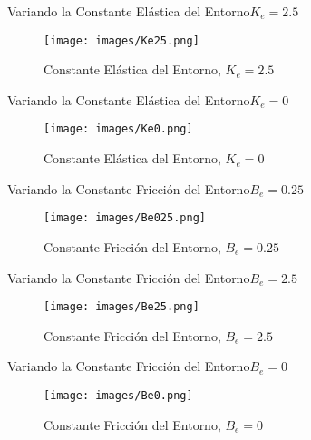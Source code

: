 \documentclass{beamer}
\begin{document}
\begin{frame}{Variando la Constante Elástica del Entorno}{$K_e=2.5$}
	
	\begin{figure}[h!]
		\centering
		\texttt{[image: images/Ke25.png]}
		\caption{Constante Elástica del Entorno, $K_e=2.5$}
		\label{KE25}
	\end{figure}
	
\end{frame}

\begin{frame}{Variando la Constante Elástica del Entorno}{$K_e=0$}
	
	\begin{figure}[h!]
		\centering
		\texttt{[image: images/Ke0.png]}
		\caption{Constante Elástica del Entorno, $K_e=0$}
		\label{KE0}
	\end{figure}
	
\end{frame}

\begin{frame}{Variando la Constante Fricción del Entorno}{$B_e=0.25$}
	
	\begin{figure}[h!]
		\centering
		\texttt{[image: images/Be025.png]}
		\caption{Constante Fricción del Entorno, $B_e=0.25$}
		\label{BE025}
	\end{figure}
	
\end{frame}

\begin{frame}{Variando la Constante Fricción del Entorno}{$B_e=2.5$}
	
	\begin{figure}[h!]
		\centering
		\texttt{[image: images/Be25.png]}
		\caption{Constante Fricción del Entorno, $B_e=2.5$}
		\label{BE25}
	\end{figure}
	
\end{frame}

\begin{frame}{Variando la Constante Fricción del Entorno}{$B_e=0$}
	
	\begin{figure}[h!]
		\centering
		\texttt{[image: images/Be0.png]}
		\caption{Constante Fricción del Entorno, $B_e=0$}
		\label{BE0}
	\end{figure}
	
\end{frame}
\end{document}
